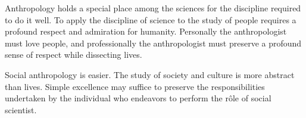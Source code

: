 

Anthropology holds a special place among the sciences for the
discipline required to do it well.  To apply the discipline of science
to the study of people requires a profound respect and admiration for
humanity.  Personally the anthropologist must love people, and
professionally the anthropologist must preserve a profound sense of
respect while dissecting lives.

Social anthropology is easier.  The study of society and culture is
more abstract than lives.  Simple excellence may suffice to preserve
the responsibilities undertaken by the individual who endeavors to
perform the r\^ole of social scientist.

\bye
